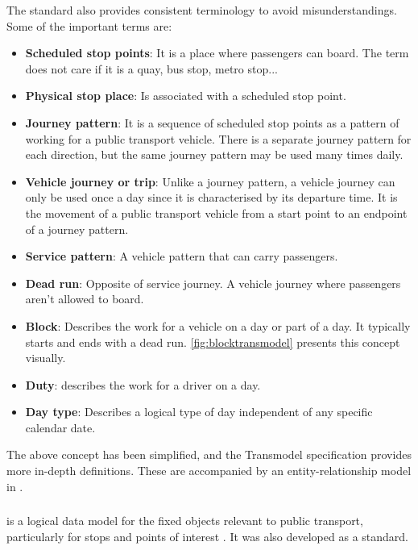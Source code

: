 The standard also provides consistent terminology to avoid misunderstandings. Some of the important terms are:
\begin{itemize}
    \item \textbf{Scheduled stop points}: It is a place where passengers can board. The term does not care if it is a quay, bus stop, metro stop...
    \item \textbf{Physical stop place}: Is associated with a scheduled stop point.
    \item \textbf{Journey pattern}: It is a sequence of scheduled stop points as a pattern of working for a public transport vehicle. There is a separate journey pattern for each direction, but the same journey pattern may be used many times daily.
    \item \textbf{Vehicle journey or trip}: Unlike a journey pattern, a vehicle journey can only be used once a day since it is characterised by its departure time. It is the movement of a public transport vehicle from a start point to an endpoint of a journey pattern.
    \item \textbf{Service pattern}: A vehicle pattern that can carry passengers.
    \item \textbf{Dead run}: Opposite of service journey. A vehicle journey where passengers aren't allowed to board. 
    \item \textbf{Block}: Describes the work for a vehicle on a day or part of a day. It typically starts and ends with a dead run. \autoref{fig:blocktransmodel} presents this concept visually.
    \item \textbf{Duty}: describes the work for a driver on a day. 
    \item \textbf{Day type}: Describes a logical type of day independent of any specific calendar date. 
\end{itemize}

The above concept has been simplified, and the Transmodel specification provides more in-depth definitions. These are accompanied by an entity-relationship model in .


\subsubsection{}
 is a logical data model for the fixed objects relevant to public transport, particularly for stops and points of interest \cite{noauthor_ifopt_nodate}. It was also developed as a  standard.

